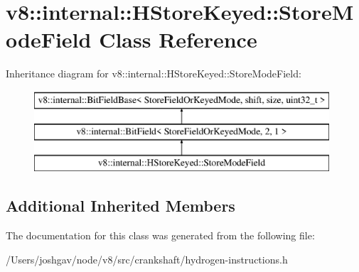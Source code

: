 \hypertarget{classv8_1_1internal_1_1_h_store_keyed_1_1_store_mode_field}{}\section{v8\+:\+:internal\+:\+:H\+Store\+Keyed\+:\+:Store\+Mode\+Field Class Reference}
\label{classv8_1_1internal_1_1_h_store_keyed_1_1_store_mode_field}
Inheritance diagram for v8\+:\+:internal\+:\+:H\+Store\+Keyed\+:\+:Store\+Mode\+Field\+:\begin{figure}[H]
\begin{center}
\leavevmode
\includegraphics[height=3.000000cm]{classv8_1_1internal_1_1_h_store_keyed_1_1_store_mode_field}
\end{center}
\end{figure}
\subsection*{Additional Inherited Members}


The documentation for this class was generated from the following file\+:\begin{DoxyCompactItemize}
\item 
/\+Users/joshgav/node/v8/src/crankshaft/hydrogen-\/instructions.\+h\end{DoxyCompactItemize}
